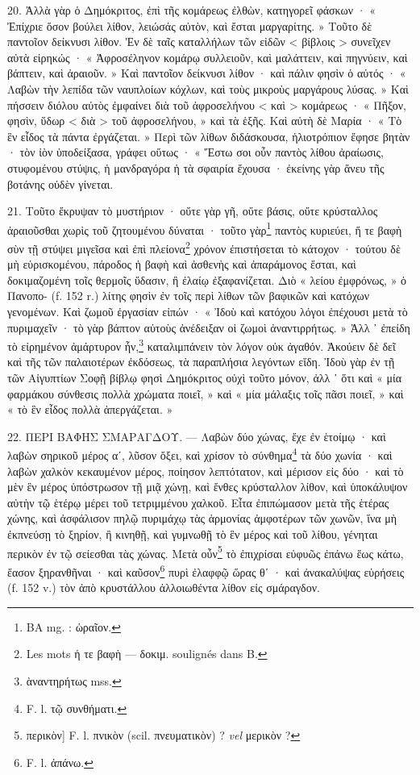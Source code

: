 \documentclass[a4paper, 11pt, oneside, polutonikogreek, french]{article}
\begin{document}
20. Ἀλλὰ γὰρ ὁ Δημόκριτος, ἐπὶ τῆς κομάρεως ἐλθὼν, κατηγορεῖ φάσκων · « Ἐπίχριε ὅσον βούλει λίθον, λειώσάς αὐτὸν, καὶ ἔσται μαργαρίτης. » Τοῦτο δὲ παντοῖον δείκνυσι λίθον. Ἐν δὲ ταῖς καταλλήλων τῶν εἰδῶν < βίβλοις > συνεῖχεν αὐτὰ εἰρηκώς · « Ἀφροσέληνον κομάρῳ συλλειοῦν, καὶ μαλάττειν, καὶ πηγνύειν, καὶ βάπτειν, καὶ ἀραιοῦν. » Καὶ παντοῖον δείκνυσι λίθον · καὶ πάλιν φησὶν ὁ αὐτός · « Λαβὼν τὴν λεπίδα τῶν ναυπλοίων κόχλων, καὶ τοὺς μικροὺς μαργάρους λύσας. » Καὶ πήσσειν διόλου αὐτὸς ἐμφαίνει διὰ τοῦ ἀφροσελήνου < καὶ > κομάρεως · « Πῆξον, φησὶν, ὕδωρ < διὰ > τοῦ ἀφροσελήνου, » καὶ τὰ ἑξῆς. Καὶ αὐτὴ δὲ Μαρία · « Τὸ ἓν εἶδος τὰ πάντα ἐργάζεται. » Περὶ τῶν λίθων διδάσκουσα, ἡλιοτρόπιον ἔφησε βητὰν · τὸν ἰὸν ὑποδείξασα, γράφει οὕτως · « Ἔστω σοι οὖν παντὸς λίθου ἀραίωσις, στυφομένου στύψις, ἡ μανδραγόρα ἡ τὰ σφαιρία ἔχουσα · ἐκείνης γὰρ ἄνευ τῆς βοτάνης οὐδὲν γίνεται.

21. Τοῦτο ἔκρυψαν τὸ μυστήριον · οὔτε γὰρ γῆ, οὔτε βάσις, οὔτε κρύσταλλος ἀραιοῦσθαι χωρὶς τοῦ ζητουμένου δύναται · τοῦτο γὰρ\footnote{BA mg. : ὡραῖον.} παντὸς κυριεύει, ἥ τε βαφὴ σὺν τῇ στύψει μιγεῖσα καὶ ἐπὶ πλείονα\footnote{Les mots ἡ τε βαφὴ --- δοκιμ. soulignés dans B.} χρόνον ἐπιστήσεται τὸ κάτοχον · τούτου δὲ μὴ εὑρισκομένου, πάροδος ἡ βαφὴ καὶ ἀσθενὴς καὶ ἀπαράμονος ἔσται, καὶ δοκιμαζομένη τοῖς θερμοῖς ὕδασιν, ἢ ἐλαίῳ ἐξαφανίζεται. Διὸ « λείου ἐμφρόνως, » ὁ Πανοπο- (f. 152 r.) λίτης φησὶν ἐν τοῖς περὶ λίθων τῶν βαφικῶν καὶ κατόχων γενομένων. Καὶ ζωμοῦ ἐργασίαν εἰπών · « Ἰδοὺ καὶ κατόχου λόγοι ἐπέχουσι μετὰ τὸ πυριμαχεῖν · τὸ γὰρ βάπτον αὐτοὺς ἀνέδειξαν οἱ ζωμοὶ ἀναντιρρήτως. » Ἀλλ ᾽ ἐπείδη τὸ εἰρημένον ἀμάρτυρον ἦν,\footnote{ὰναντηρήτως mss.} καταλιμπάνειν τὸν λόγον οὐκ ἀγαθόν. Ἀκούειν δὲ δεῖ καὶ τῆς τῶν παλαιοτέρων ἐκδόσεως, τὰ παραπλήσια λεγόντων εἴδη. Ἰδοὺ γὰρ ἐν τῇ τῶν Αἰγυπτίων Σοφῇ βίβλῳ φησὶ Δημόκριτος οὐχὶ τοῦτο μόνον, ἀλλ ᾽ ὅτι καὶ « μία φαρμάκου σύνθεσις πολλὰ χρώματα ποιεῖ, » καὶ « μία μάλαξις τοῖς πᾶσι ποιεῖ, » καὶ « τὸ ἓν εἶδος πολλὰ ἀπεργάζεται. »

22. ΠΕΡΙ ΒΑΦΗΣ ΣΜΑΡΑΓΔΟΥ. --- Λαβὼν δύο χώνας, ἔχε ἐν ἑτοίμῳ · καὶ λαβὼν σηρικοῦ μέρος αʹ, λῦσον ὄξει, καὶ χρίσον τὸ σύνθημα\footnote{F. l. τῷ συνθήματι.} τὰ δύο χωνία · καὶ λαβὼν χαλκὸν κεκαυμένον μέρος, ποίησον λεπτότατον, καὶ μέρισον εἰς δύο · καὶ τὸ μὲν ἓν μέρος ὑπόστρωσον τῇ μιᾷ χώνῃ, καὶ ἔνθες κρύσταλλον λίθον, καὶ ὑποκάλυψον αὐτὴν τῷ ἑτέρῳ μέρει τοῦ τετριμμένου χαλκοῦ. Εἶτα ἐπιπώμασον μετὰ τῆς ἑτέρας χώνης, καὶ ἀσφάλισον πηλῷ πυριμάχῳ τὰς ἁρμονίας ἀμφοτέρων τῶν χωνῶν, ἵνα μὴ ἐκπνεύσῃ τὸ ξηρίον, ἢ κινηθῇ, καὶ γυμνωθῇ τὸ ἓν μέρος καὶ τοῦ λίθου, γένηται περικὸν ἐν τῷ σείεσθαι τὰς χώνας. Μετὰ οὖν\footnote{περικὸν] F. l. πνικὸν (scil. πνευματικὸν) ? \emph{vel} μερικὸν ?} τὸ ἐπιχρίσαι εὐφυῶς ἐπάνω ἕως κάτω, ἔασον ξηρανθῆναι · καὶ καῦσον\footnote{F. l. ἀπάνω.} πυρὶ ἐλαφφῷ ὥρας θʹ · καὶ ἀνακαλύψας εὑρήσεις (f. 152 v.) τὸν ἀπὸ κρυστάλλου ἀλλοιωθέντα λίθον εἰς σμάραγδον.
\end{document}

